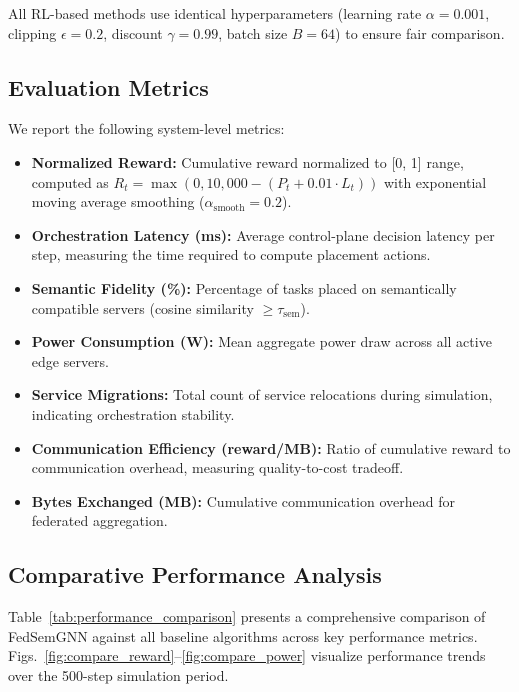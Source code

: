 All RL-based methods use identical hyperparameters (learning rate $\alpha = 0.001$, clipping $\epsilon = 0.2$, discount $\gamma = 0.99$, batch size $B = 64$) to ensure fair comparison.

\subsection{Evaluation Metrics}
We report the following system-level metrics:
\begin{itemize}
	\item \textbf{Normalized Reward:} Cumulative reward normalized to [0, 1] range, computed as $R_t = \max(0, 10{,}000 - (P_t + 0.01 \cdot L_t))$ with exponential moving average smoothing ($\alpha_{\text{smooth}} = 0.2$).
	\item \textbf{Orchestration Latency (ms):} Average control-plane decision latency per step, measuring the time required to compute placement actions.
	\item \textbf{Semantic Fidelity (\%):} Percentage of tasks placed on semantically compatible servers (cosine similarity $\geq \tau_{\text{sem}}$).
	\item \textbf{Power Consumption (W):} Mean aggregate power draw across all active edge servers.
	\item \textbf{Service Migrations:} Total count of service relocations during simulation, indicating orchestration stability.
	\item \textbf{Communication Efficiency (reward/MB):} Ratio of cumulative reward to communication overhead, measuring quality-to-cost tradeoff.
	\item \textbf{Bytes Exchanged (MB):} Cumulative communication overhead for federated aggregation.
\end{itemize}

\subsection{Comparative Performance Analysis}

Table~\ref{tab:performance_comparison} presents a comprehensive comparison of FedSemGNN against all baseline algorithms across key performance metrics. Figs.~\ref{fig:compare_reward}--\ref{fig:compare_power} visualize performance trends over the 500-step simulation period.

